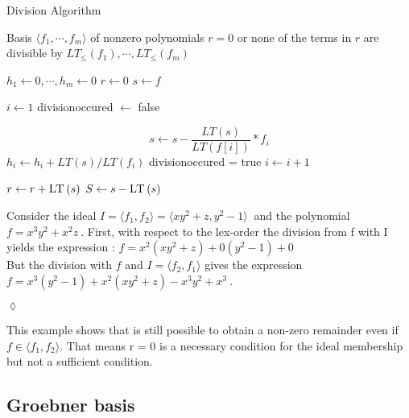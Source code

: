 \begin{algorithm}
\caption{Division Algorithm}
\label{alg:division}
\begin{algorithmic}[1]

\Require Basis $\langle f_{1}, \cdots, f_{m}\rangle$ of nonzero polynomials  
\Ensure $r=0$ or none of the terms in $r$ are divisible by $ LT_{\leq}\left( f_{1}\right) , \cdots , LT_{\leq} \left( f_{m}\right) $

\State $ h_{1} \gets 0 , \cdots , h_{m} \gets 0  $
\State $ r \gets 0 $
\State $ s \gets f $

\State $ i \gets 1 $
\State  division\textunderscore occured $ \gets $  false 

\State \[ s \gets s -  \frac{LT \left( s\right)}{LT \left( f \left[ i\right] \right)}  \ast f_{i} \]
\State $h_{i} \gets h_{i} + LT\left( s\right) / LT\left( f_{i}\right) $
\State division\textunderscore occured = true
\Else
\State $i \gets i+1$
\EndIf
\EndWhile

\State $ r \gets r + \textsc{LT}\left( s\right) $
\State $ S \gets s - \textsc{LT}\left( s\right) $
\EndIf

\EndWhile


\end{algorithmic}
\end{algorithm}


\begin{env_example}\normalfont
Consider the ideal $I = \langle f_{1},f_{2} \rangle = \langle xy^{2}+z,y^{2}-1 \rangle~$
and the polynomial $f = x^{3}y^{2}+x^{2}z~$.
First, with respect to the lex-order the division from f with I yields the expression : $f = x^{2}(xy^{2}+z) + 0(y^{2}-1) + 0$ \\
But the division with $f$ and $I = \langle f_{2},f_{1} \rangle$ gives the expression $f = x^{3}(y^{2}-1) + x^{2}(xy^{2}+z) -x^{3}y^{2}+x^{3}~$.
\begin{flushright}
$\lozenge$
\end{flushright}
\end{env_example}



This example shows that is still possible to obtain a non-zero remainder even if $f \in \langle f_{1},f_{2} \rangle $. That means r = 0 is a  necessary condition for the ideal membership but not a sufficient condition.
\subsection{Groebner basis}
\label{subsec:Groebner}

